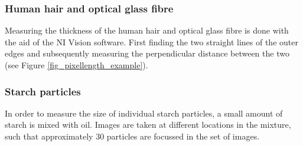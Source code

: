 \subsubsection{Human hair and optical glass fibre}

Measuring the thickness of the human hair and optical glass fibre is done with the aid of the NI Vision software. First finding the two straight lines of the outer edges and subsequently measuring the perpendicular distance between the two (see Figure \ref{fig_pixellength_example}). 

\subsubsection{Starch particles}

In order to measure the size of individual starch particles, a small amount of starch is mixed with oil. Images are taken at different locations in the mixture, such that approximately 30 particles are focussed in the set of images.










\begin{comment}
The Experimentele opstelling or Experimentele  methode (Experimental  set  up  or  Experimental method) chapter describes the experimental setup and the experimental methods used in sufficient detail such that a reader can judge the soundness and, in principle, may verify the conclusions of your research. Also,  this  chapter  should  be  informative  for  a  reader  who  wants  to  perform  similar  research.  Preferably  use clear sketches of the setup, rather than photographs. In this chapter you also describe the accuracywith which direct observables have been measured, and the accuracy of the important deduced quantities. Detailed accuracy calculations should be put in an Appendix
\end{comment}
